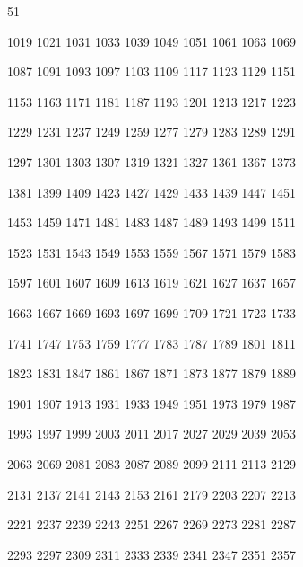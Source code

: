 \documentclass{article}
\begin{document}

51

1019   1021   1031   1033   1039   1049   1051   1061   1063   1069 

   1087   1091   1093   1097   1103   1109   1117   1123   1129   1151 

   1153   1163   1171   1181   1187   1193   1201   1213   1217   1223 

   1229   1231   1237   1249   1259   1277   1279   1283   1289   1291 

   1297   1301   1303   1307   1319   1321   1327   1361   1367   1373 

   1381   1399   1409   1423   1427   1429   1433   1439   1447   1451 

   1453   1459   1471   1481   1483   1487   1489   1493   1499   1511 

   1523   1531   1543   1549   1553   1559   1567   1571   1579   1583 

   1597   1601   1607   1609   1613   1619   1621   1627   1637   1657 

   1663   1667   1669   1693   1697   1699   1709   1721   1723   1733 

   1741   1747   1753   1759   1777   1783   1787   1789   1801   1811 

   1823   1831   1847   1861   1867   1871   1873   1877   1879   1889 

   1901   1907   1913   1931   1933   1949   1951   1973   1979   1987 

   1993   1997   1999   2003   2011   2017   2027   2029   2039   2053 

   2063   2069   2081   2083   2087   2089   2099   2111   2113   2129 

   2131   2137   2141   2143   2153   2161   2179   2203   2207   2213 

   2221   2237   2239   2243   2251   2267   2269   2273   2281   2287 

   2293   2297   2309   2311   2333   2339   2341   2347   2351   2357
\end{document}
